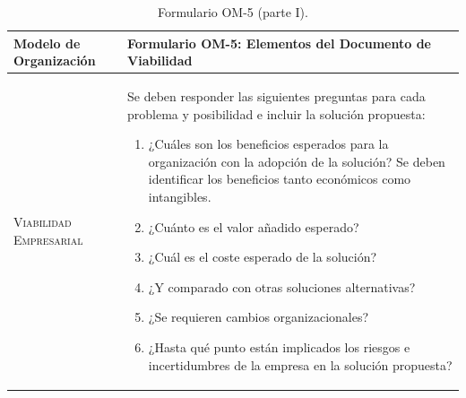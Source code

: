 \documentclass[12pt,a4paper,twoside,spanish]{article}      %
\begin{document}
        \begin{table}[H]
            \scriptsize
            \begin{tabularx}{\textwidth}{|l|X|} \hline

                \textbf{Modelo de Organización} & \textbf{Formulario OM-5: Elementos del Documento de Viabilidad}\\ \hline\hline
                
                \textsc{Viabilidad Empresarial} & Se deben responder las siguientes preguntas para cada problema y posibilidad e incluir la solución propuesta:
                
                \begin{enumerate}
                    \item¿Cuáles son los beneficios esperados para la organización con la adopción de la solución? Se deben identificar los beneficios tanto económicos como intangibles.
                    
                    \item¿Cuánto es el valor añadido esperado?
                    
                    \item¿Cuál es el coste esperado de la solución? 
                    
                    \item¿Y comparado con otras soluciones alternativas?
                    
                    \item¿Se requieren cambios organizacionales?
                    
                    \item¿Hasta qué punto están implicados los riesgos e incertidumbres de la empresa en la solución propuesta?
                \end{enumerate}
                \\ \hline
            \end{tabularx}
            \caption{Formulario OM-5 (parte I).}
              \label{tab.OM5_1}
        \end{table}
        
\end{document}
